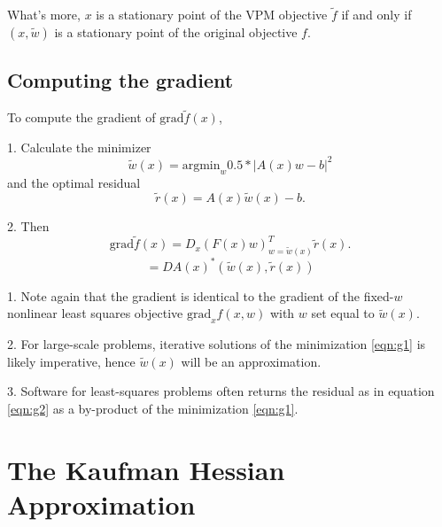 What's more, $x$ is a stationary point of the VPM objective $\tilde{f}$ if and only if $(x,\tilde{w})$ is a stationary point of the original objective $f$.

\subsection{Computing the gradient}
To compute the gradient of $\mbox{grad} \tilde{f}(x)$,

1. Calculate the minimizer 
\begin{equation}
  \label{eqn:g1}
\tilde{w}(x) = \mbox{argmin}_w 0.5*|A(x)w-b|^2
\end{equation}
and the optimal residual
\begin{equation}
  \label{eqn:g2}
  \tilde{r}(x) = A(x)\tilde{w}(x) - b.
\end{equation}

2.  Then
$$
\mbox{grad} \tilde{f}(x) = D_x(F(x)w)^T_{w=\tilde{w}(x)} \tilde{r}(x).
$$
\begin{equation}
  \label{eqn:g3}
= DA(x)^*(\tilde{w}(x),\tilde{r}(x))
\end{equation}

1. Note again that the gradient is identical to the gradient of the fixed-$w$ nonlinear least squares objective $\mbox{grad}_{x} f(x,w)$ with $w$ set equal to $\tilde{w}(x)$.

2. For large-scale problems, iterative solutions of the minimization \ref{eqn:g1} is likely imperative, hence $\tilde{w}(x)$ will be an approximation.

3. Software for least-squares problems often returns the residual as in equation \ref{eqn:g2} as a by-product of the minimization \ref{eqn:g1}.

\section{The Kaufman Hessian Approximation}

